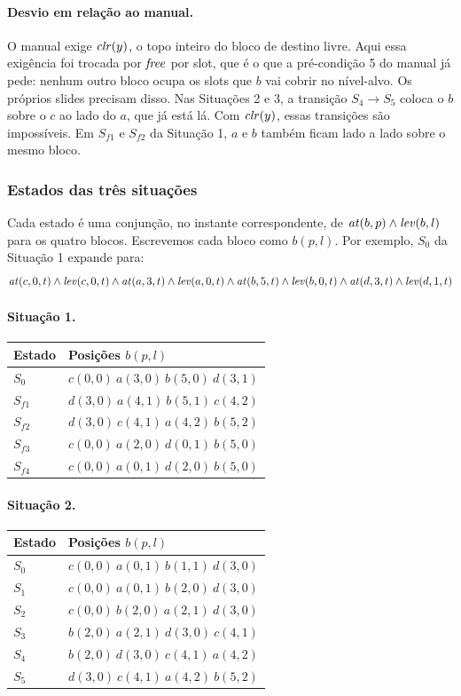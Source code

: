 \paragraph{Desvio em relação ao manual.}
O manual exige $\mathit{clr}(y)$, o topo inteiro do bloco de destino livre. Aqui essa exigência foi trocada por $\mathit{free}$ por slot, que é o que a pré-condição 5 do manual já pede: nenhum outro bloco ocupa os slots que $b$ vai cobrir no nível-alvo.
Os próprios slides precisam disso. Nas Situações 2 e 3, a transição $S_4\to S_5$ coloca o $b$ sobre o $c$ ao lado do $a$, que já está lá. Com $\mathit{clr}(y)$, essas transições são impossíveis. Em $S_{f1}$ e $S_{f2}$ da Situação 1, $a$ e $b$ também ficam lado a lado sobre o mesmo bloco.

\subsubsection{Estados das três situações}
Cada estado é uma conjunção, no instante correspondente, de $\mathit{at}(b,p)\land\mathit{lev}(b,l)$ para os quatro blocos. Escrevemos cada bloco como $b(p,l)$. Por exemplo, $S_0$ da Situação 1 expande para:
\[
\mathit{at}(c,0,t)\land\mathit{lev}(c,0,t)\land\mathit{at}(a,3,t)\land\mathit{lev}(a,0,t)\land\mathit{at}(b,5,t)\land\mathit{lev}(b,0,t)\land\mathit{at}(d,3,t)\land\mathit{lev}(d,1,t)
\]

\paragraph{Situação 1.}
\begin{center}
\begin{tabular}{l l}
\toprule
Estado & Posições $b(p,l)$ \\
\midrule
$S_0$    & $c(0,0)\ a(3,0)\ b(5,0)\ d(3,1)$ \\
$S_{f1}$ & $d(3,0)\ a(4,1)\ b(5,1)\ c(4,2)$ \\
$S_{f2}$ & $d(3,0)\ c(4,1)\ a(4,2)\ b(5,2)$ \\
$S_{f3}$ & $c(0,0)\ a(2,0)\ d(0,1)\ b(5,0)$ \\
$S_{f4}$ & $c(0,0)\ a(0,1)\ d(2,0)\ b(5,0)$ \\
\bottomrule
\end{tabular}
\end{center}

\paragraph{Situação 2.}
\begin{center}
\begin{tabular}{l l}
\toprule
Estado & Posições $b(p,l)$ \\
\midrule
$S_0$ & $c(0,0)\ a(0,1)\ b(1,1)\ d(3,0)$ \\
$S_1$ & $c(0,0)\ a(0,1)\ b(2,0)\ d(3,0)$ \\
$S_2$ & $c(0,0)\ b(2,0)\ a(2,1)\ d(3,0)$ \\
$S_3$ & $b(2,0)\ a(2,1)\ d(3,0)\ c(4,1)$ \\
$S_4$ & $b(2,0)\ d(3,0)\ c(4,1)\ a(4,2)$ \\
$S_5$ & $d(3,0)\ c(4,1)\ a(4,2)\ b(5,2)$ \\
\bottomrule
\end{tabular}
\end{center}

